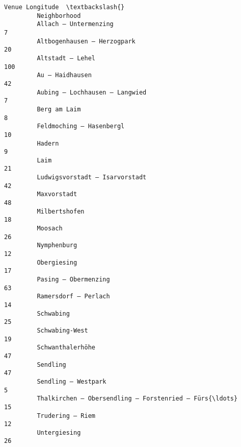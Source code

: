\documentclass[11pt]{article}
\begin{document}
\begin{Verbatim}[commandchars=\\\{\}]
                                                             Venue Longitude  \textbackslash{}
         Neighborhood                                                          
         Allach – Untermenzing                                             7   
         Altbogenhausen – Herzogpark                                      20   
         Altstadt – Lehel                                                100   
         Au – Haidhausen                                                  42   
         Aubing – Lochhausen – Langwied                                    7   
         Berg am Laim                                                      8   
         Feldmoching – Hasenbergl                                         10   
         Hadern                                                            9   
         Laim                                                             21   
         Ludwigsvorstadt – Isarvorstadt                                   42   
         Maxvorstadt                                                      48   
         Milbertshofen                                                    18   
         Moosach                                                          26   
         Nymphenburg                                                      12   
         Obergiesing                                                      17   
         Pasing – Obermenzing                                             63   
         Ramersdorf – Perlach                                             14   
         Schwabing                                                        25   
         Schwabing-West                                                   19   
         Schwanthalerhöhe                                                 47   
         Sendling                                                         47   
         Sendling – Westpark                                               5   
         Thalkirchen – Obersendling – Forstenried – Fürs{\ldots}               15   
         Trudering – Riem                                                 12   
         Untergiesing                                                     26   
         

\end{Verbatim}
\end{document}
